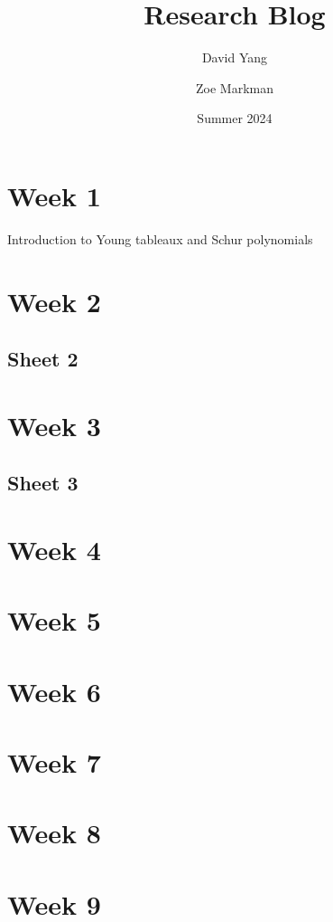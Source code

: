 \documentclass[11pt]{article}
\begin{document}
\title{\textbf{Research Blog}}
\author{David Yang \and Zoe Markman}
\date{Summer 2024}

\maketitle

\section{Week 1}
Introduction to Young tableaux and Schur polynomials

\section{Week 2}


\subsection{Sheet 2}


\newpage

\section{Week 3}


\subsection{Sheet 3}


\newpage

\section{Week 4}


\newpage

\section{Week 5}


\newpage

\section{Week 6}


\newpage
\section{Week 7}


\newpage
\section{Week 8}


\newpage
\section{Week 9}

\end{document}
